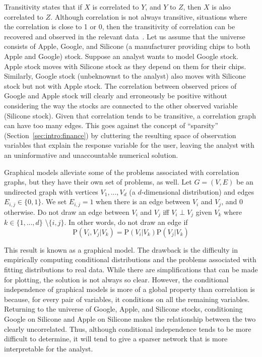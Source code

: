 Transitivity states that if $X$ is correlated to $Y$, and $Y$ to $Z$,
then $X$ is also correlated to $Z$. Although correlation is not always
transitive, situations where the correlation is close to 1 or 0, then the
transitivity of correlation can be recovered and observed in the relevant
data~\cite{tao2014}. Let us assume that the universe consists of Apple, Google, 
and Silicone (a manufacturer providing chips to both Apple and Google) stock. 
Suppose an analyst wants to model Google stock. 
Apple stock moves with Silicone stock as they
depend on them for their chips. Similarly, Google stock (unbeknownst to the
analyst) also moves with Silicone stock but not with Apple stock. The
correlation between observed prices of Google and Apple stock will clearly and
erroneously be positive without considering the way the stocks are connected to
the other observed variable (Silicone stock). Given that correlation tends to be
transitive, a correlation graph can have too many edges. This goes against the
concept of ``sparsity'' (Section~\ref{sec:intro:finance}) by cluttering the 
resulting space of observation
variables that explain the response variable for the user, leaving the
analyst with an uninformative and unaccountable numerical solution.

Graphical models alleviate some of the problems associated with correlation
graphs, but they have their own set of problems, as well. Let $G=(V,E)$ be an
undirected graph with vertices $V_1,...,V_d$ (a
$d$-dimensional distribution) and edges $E_{i,j}\in\{0,1\}$. We set $E_{i,j}=1$
when there is an edge between $V_i$ and $V_j$, and 0 otherwise. Do not draw an
edge between $V_i$ and $V_j$ iff $V_i \perp V_j$ given $V_k$ where
$k\in\{1,...,d\}$ \textbackslash $\{i,j\}$. In other words, do not draw an edge
if
$$\text{P}(V_i,V_j|V_k)=\text{P}(V_i|V_k)\text{P}(V_j|V_k)$$

This result is known as a graphical model. The drawback is the difficulty in
empirically computing conditional distributions and the problems associated with
fitting distributions to real data. While there are simplifications that can be
made for plotting, the solution is not always so clear. 
However, the conditional independence of
graphical models is more of a global property than correlation is because, for
every pair of variables, it conditions on all the remaining variables. Returning
to the universe of Google, Apple, and Silicone stocks, conditioning Google on
Silicone and Apple on Silicone makes the relationship between the two clearly
uncorrelated. Thus, although conditional independence tends to be more difficult
to determine, it will tend to give a sparser network that is more interpretable
for the analyst.

